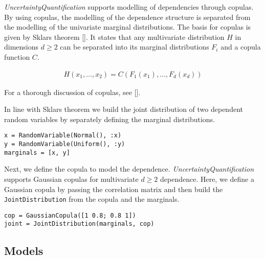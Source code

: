 \label{1748328383054528076}{}


\emph{UncertaintyQuantification} supports modelling of dependencies through copulas. By using copulas, the modelling of the dependence structure is separated from the modelling of the univariate marginal distributions. The basis for copulas is given by Sklar{\textquotesingle}s theorem []. It states that any multivariate distribution \(H\) in dimensions \(d \geq 2\) can be separated into its marginal distributions \(F_i\) and a copula function \(C\).



\begin{equation*}
\begin{split}H(x_1,\ldots,x_2) = C(F_1(x_1),\ldots,F_d(x_d))\end{split}\end{equation*}


For a thorough discussion of copulas, see [].



In line with Sklar{\textquotesingle}s theorem we build the joint distribution of two dependent random variables by separately defining the marginal distributions.




\begin{verbatim}
x = RandomVariable(Normal(), :x)
y = RandomVariable(Uniform(), :y)
marginals = [x, y]
\end{verbatim}



Next, we define the copula to model the dependence. \emph{UncertaintyQuantification} supports Gaussian copulas for multivariate \(d \geq 2\) dependence. Here, we define a Gaussian copula by passing the correlation matrix and then build the \texttt{JointDistribution} from the copula and the marginals.




\begin{verbatim}
cop = GaussianCopula([1 0.8; 0.8 1])
joint = JointDistribution(marginals, cop)
\end{verbatim}



\subsection{Models}



\label{3607757037139922397}{}



